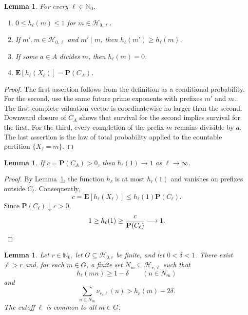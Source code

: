 \documentclass[11pt]{amsart}
\newtheorem{lemma}[theorem]{Lemma}
\theoremstyle{definition}
\numberwithin{equation}{section}
\newcommand{\Nzero}{\mathbb N_0}
\newcommand{\Prob}{\mathbf P}
\newcommand{\Exp}{\mathbf E}
\newcommand{\Hblock}[2]{\mathcal H_{#1,#2}}
\begin{document}
\begin{lemma}\label{lem:survival-properties}
For every $\ell\in\Nzero$,
\begin{enumerate}[label=\textup{(\roman*)},leftmargin=2.4em,itemsep=3pt]
  \item $0\leq h_\ell(m)\leq1$ for $m\in\Hblock{0}{\ell}$.
  \item If $m',m\in\Hblock{0}{\ell}$ and $m'\mid m$, then $h_\ell(m')\geq h_\ell(m)$.
  \item If some $a\in A$ divides $m$, then $h_\ell(m)=0$.
  \item $\Exp[h_\ell(X_\ell)]=\Prob(C_A)$.
\end{enumerate}
\end{lemma}

\begin{proof}
The first assertion follows from the definition as a conditional probability.
For the second, use the same future prime exponents with prefixes $m'$ and $m$.
The first complete valuation vector is coordinatewise no larger than the second.
Downward closure of $C_A$ shows that survival for the second implies survival for the first.
For the third, every completion of the prefix $m$ remains divisible by $a$.
The last assertion is the law of total probability applied to the countable partition $\{X_\ell=m\}$.
\end{proof}

\begin{lemma}\label{lem:zero-prefix}
If $c=\Prob(C_A)>0$, then $h_\ell(1)\to1$ as $\ell\to\infty$.
\end{lemma}

\begin{proof}
By Lemma~\ref{lem:survival-properties}, the function $h_\ell$ is at most $h_\ell(1)$ and vanishes on prefixes outside $C_\ell$.
Consequently,
\[
  c=\Exp[h_\ell(X_\ell)]\leq h_\ell(1)\Prob(C_\ell).
\]
Since $\Prob(C_\ell)\downarrow c>0$,
\[
  1\geq h_\ell(1)\geq\frac{c}{\Prob(C_\ell)}\longrightarrow1.\qedhere
\]
\end{proof}

\begin{lemma}\label{lem:finite-pruning}
Let $r\in\Nzero$, let $G\subseteq\Hblock{0}{r}$ be finite, and let $0<\delta<1$.
There exist $\ell>r$ and, for each $m\in G$, a finite set $N_m\subseteq\Hblock{r}{\ell}$ such that
\begin{equation}\label{eq:pruning-score}
  h_\ell(mn)\geq1-\delta\qquad(n\in N_m)
\end{equation}
and
\begin{equation}\label{eq:pruning-mass}
  \sum_{n\in N_m}\nu_{r,\ell}(n)>h_r(m)-2\delta.
\end{equation}
The cutoff $\ell$ is common to all $m\in G$.
\end{lemma}
\end{document}
